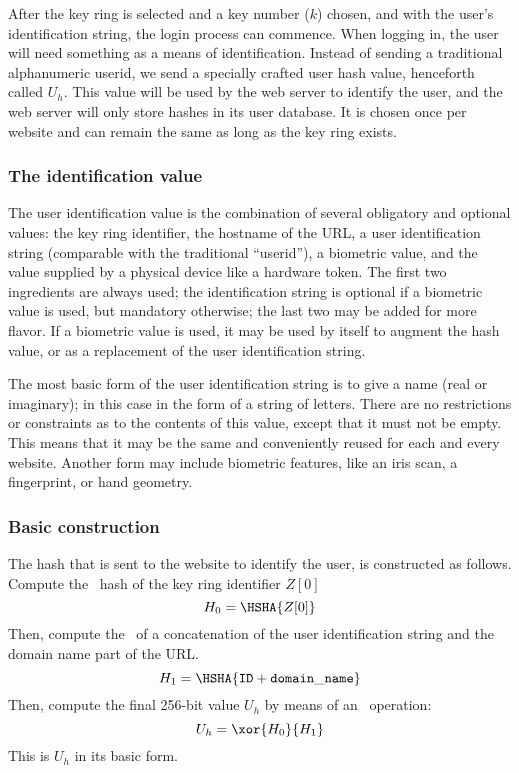 %
%
%
\label{logging_in}
After the key ring is selected and a key number ($k$) chosen,
and with the user's identification string,
the login process can commence.
\label{sec:user_ids}
When logging in,
the user will need something as a means of identification.
Instead of sending a traditional alphanumeric userid,
we send a specially crafted user hash value,
henceforth called $U_h$.
This value will be used by the web server to identify the user,
and the web server will only store hashes in its user database.
It is chosen once per website and can remain the same as long as the key ring exists.
\subsubsection{The identification value}
The user identification value is the combination of several obligatory and optional values:
the key ring identifier,
the hostname of the URL,
a user identification string
(comparable with the traditional ``userid''),
a biometric value,
and the value supplied by a physical device like a hardware token.
The first two ingredients are always used;
the identification string is optional if a biometric value is used, but mandatory otherwise;
the last two may be added for more flavor.
If a biometric value is used,
it may be used by itself to augment the hash value,
or as a replacement of the user identification string.
\par
The most basic form of the user identification string is to give a name
(real or imaginary);
in this case in the form of a string of letters.
There are no restrictions or constraints as to the contents of this value,
except that it must not be empty.
This means that it may be the same and conveniently reused for each and every website.
Another form may include biometric features,
like an iris scan,
a fingerprint,
or hand geometry.
\subsubsection{Basic construction}
The hash that is sent to the website to identify the user,
is constructed as follows.
Compute the \SHA\ hash of the key ring identifier $Z[0]$
\[H_0=\HSHA{Z[0]}\]
Then,
compute the \SHA\ of a concatenation of the user identification string
and the domain name part of the URL.
\[H_1=\HSHA{\mathtt{ID+domain\_name}}\]
Then, compute the final 256-bit value $U_h$ by means of an \XOR\ operation:
\[U_h=\xor{H_0}{H_1}\]
This is $U_h$ in its basic form.
